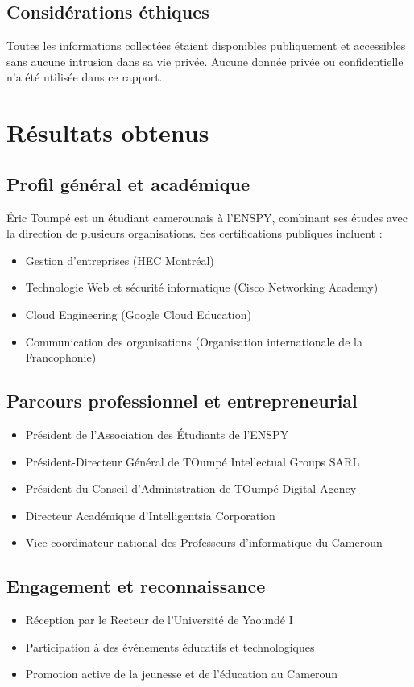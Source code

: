 \documentclass[memoire, 12pt]{report}
\begin{document}
\section{Considérations éthiques}
Toutes les informations collectées étaient disponibles publiquement et accessibles sans aucune intrusion dans sa vie privée.  
Aucune donnée privée ou confidentielle n’a été utilisée dans ce rapport.

\chapter{Résultats obtenus}

\section{Profil général et académique}
Éric Toumpé est un étudiant camerounais à l'ENSPY, combinant ses études avec la direction de plusieurs organisations.  
Ses certifications publiques incluent :
\begin{itemize}
    \item Gestion d'entreprises (HEC Montréal)
    \item Technologie Web et sécurité informatique (Cisco Networking Academy)
    \item Cloud Engineering (Google Cloud Education)
    \item Communication des organisations (Organisation internationale de la Francophonie)
\end{itemize}

\section{Parcours professionnel et entrepreneurial}
\begin{itemize}
    \item Président de l’Association des Étudiants de l’ENSPY
    \item Président-Directeur Général de TOumpé Intellectual Groups SARL
    \item Président du Conseil d’Administration de TOumpé Digital Agency
    \item Directeur Académique d’Intelligentsia Corporation
    \item Vice-coordinateur national des Professeurs d’informatique du Cameroun
\end{itemize}

\section{Engagement et reconnaissance}
\begin{itemize}
    \item Réception par le Recteur de l’Université de Yaoundé I
    \item Participation à des événements éducatifs et technologiques
    \item Promotion active de la jeunesse et de l’éducation au Cameroun
\end{itemize}
\end{document}
